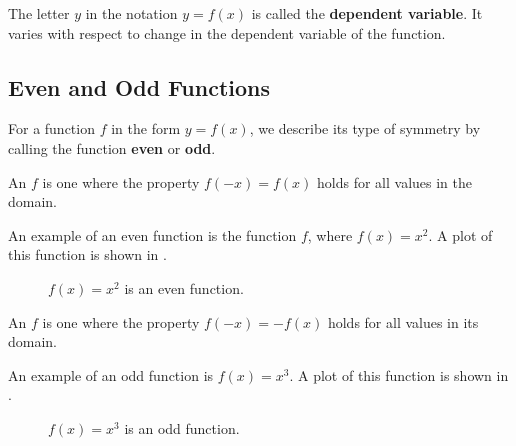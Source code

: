   The letter $y$ in the notation $y=f(x)$ is called the 
  \textbf{dependent variable}.
  It varies with respect to change in the dependent variable of the function.

\subsection{Even and Odd Functions}

For a function $f$ in the form $y=f(x)$, we describe its type of symmetry by 
calling the function \textbf{even} or 
\textbf{odd}.

\begin{defn}
  An  $f$
  is one where the property $f(-x)=f(x)$ holds for all values in the domain.
\end{defn}

\begin{ex}
An example of an even function is the function $f$,
where $f(x)=x^2$.
A plot of this function is shown in .

\begin{figure}
\begin{center}
\end{center}
\caption{$f(x) = x^2$ is an even function.}
\label{fig:functions:even}
\end{figure}
\end{ex}

\begin{defn}
  An  $f$
  is one where the property $f(-x)=-f(x)$ holds for all values in its domain.
\end{defn}

\begin{ex}
  An example of an odd function is $f(x)=x^3$.
  A plot of this function is shown in .
  \begin{figure}[H]
    \begin{center}
    \end{center}
    \caption{$f(x)=x^3$ is an odd function.}
    \label{fig:functions:odd}
  \end{figure}
\end{ex}

